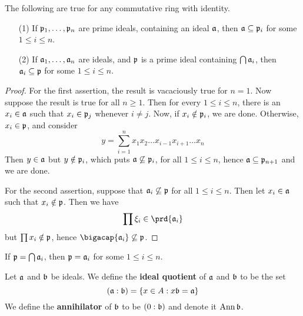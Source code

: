 \begin{lemma}\label{1.9.7}
    The following are true for any commutative ring with identity.
    \begin{enumerate}
        \item[(1)] If $\pf_1, \dots, \pf_n$ are prime ideals, containing an
            ideal $\af$, then $\af \subseteq \pf_i$ for some  $1 \leq i \leq n$.

        \item[(2)] If $\af_1, \dots, \af_n$ are ideals, and $\pf$ is a prime
            ideal containing  $\bigcap{\af_i}$, then $\af_i \subseteq \pf$ for
            some  $1 \leq i \leq n$.
    \end{enumerate}
\end{lemma}
\begin{proof}
    For the first assertion, the result is vacaciously true for $n=1$. Now
    suppose the result is true for all  $n \geq 1$. Then for every  $1 \leq i
    \leq n$, there is an  $x_i \in \af$ such that  $x_i \in \pf_j$ whenever  $i
    \neq j$. Now, if  $x_i \notin \pf_i$, we are done. Otherwise, $x_i \in \pf$,
    and consider
    \begin{equation*}
        y=\sum_{i=1}^n{x_1x_2 \dots x_{i-1}x_{i+1} \dots x_n}
    \end{equation*}
    Then $y \in \af$ but $y \notin \pf_i$, which puts  $\af \not\subseteq
    \pf_i$, for all $1 \leq i \leq n$, hence $\af \subseteq \pf_{n+1}$ and we
    are done.

    For the second assertion, suppose that $\af_i \not\subseteq \pf$ for all
    $1 \leq i \leq n$. Then let  $x_i \in \af$ such that  $x_i \notin\pf$. Then
    we have
    \begin{equation*}
        \prod{\x_i} \in \prd{\af_i}
    \end{equation*}
    but $\prod{x_i} \notin \pf$, hence $\bigacap{\af_i} \not\subseteq \pf$.
\end{proof}
\begin{corollary}
    If $\pf=\bigcap{\af_i}$, then $\pf=\af_i$ for some  $1 \leq i \leq n$.
\end{corollary}

\begin{definition}
    Let $\af$ and $\bf$ be ideals. We define the \textbf{ideal quotient} of
    $\af$ and  $\bf$ to be the set
    \begin{equation*}
        (\af:\bf)=\{x \in A : x\bf=\af\}
    \end{equation*}
    We define the \textbf{annihilator} of $\bf$ to be $(0:\bf)$ and denote it
    $\Ann{\bf}$.
\end{definition}

